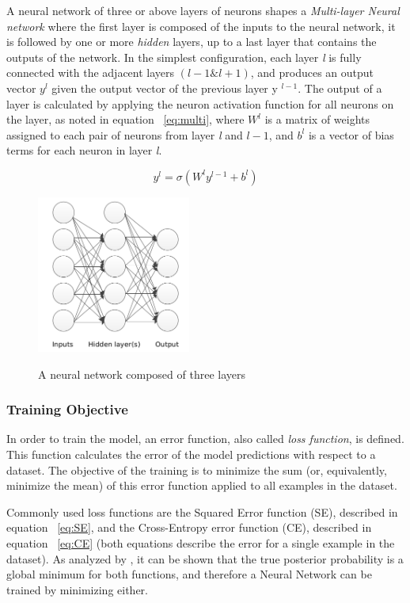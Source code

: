 A neural network of three or above layers of neurons shapes a \textit{Multi-layer Neural network} where the first layer is composed of the inputs to the neural network, it is followed by one or more \textit{hidden} layers, up to a last layer that contains the outputs of the network. In the simplest configuration, each layer \textit{l} is fully connected with the adjacent layers $(l - 1 \& l + 1)$, and produces an output vector $y^{l}$ given the output vector of the previous layer y $^{l-1}$. The output of a layer is calculated by applying the neuron activation function for all neurons on the layer, as noted in equation ~\ref{eq:multi}, where $W^{l}$ is a matrix of weights assigned to each pair of neurons from layer \textit{l} and $l - 1$, and $b^{l}$ is a vector of bias terms for each neuron in layer \textit{l}.

\begin{equation}
y^{l} = \sigma(W^{l}y^{l-1}+ b^{l}) 
\label{eq:multi}
\end{equation}


\begin{figure}[H]
	\centering
	{\includegraphics[width=0.45\textwidth]{images/mann}}
	\caption{A neural network composed of three layers}
	\label{fig:multi}
\end{figure}

\subsubsection{Training Objective} 
In order to train the model, an error function, also called \textit{loss function}, is defined. This function calculates the error of the model predictions with respect to a dataset. The objective of the training is to minimize the sum (or, equivalently, minimize the mean) of this error function applied to all examples in the dataset. 

\indent Commonly used loss functions are the Squared Error function (SE), described in equation ~\ref{eq:SE}, and the Cross-Entropy error function (CE), described in equation ~\ref{eq:CE} (both equations describe the error for a single example in the dataset). As analyzed by \citealt{golik2013cross}, it can be shown that the true posterior probability is a global minimum for both functions, and therefore a Neural Network can be trained by minimizing either. 

